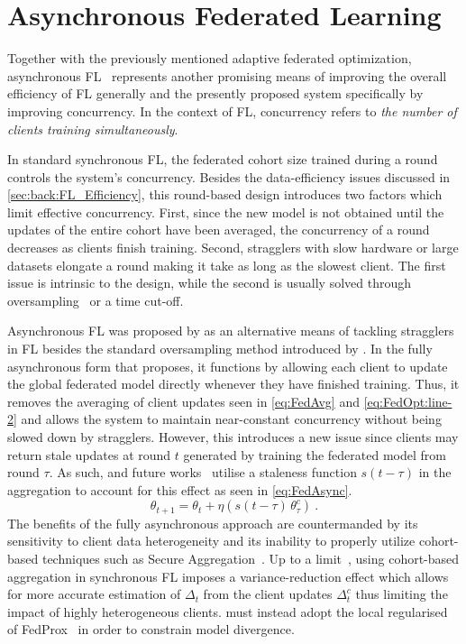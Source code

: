 \section{Asynchronous Federated Learning}
Together with the previously mentioned adaptive federated optimization, asynchronous FL~\citep{AsyncFedOpt,FedBuff,PAPAYA,AsynchronousFLonHetDevicesSurvey,AsyncrhonousOnlineFL} represents another promising means of improving the overall efficiency of FL generally and the presently proposed system specifically by improving concurrency. In the context of FL, concurrency refers to \emph{the number of clients training simultaneously}.

In standard synchronous FL, the federated cohort size trained during a round controls the system's concurrency. Besides the data-efficiency issues discussed in \cref{sec:back:FL_Efficiency}, this round-based design introduces two factors which limit effective concurrency. First, since the new model is not obtained until the updates of the entire cohort have been averaged, the concurrency of a round decreases as clients finish training. Second, stragglers with slow hardware or large datasets elongate a round making it take as long as the slowest client. The first issue is intrinsic to the design, while the second is usually solved through oversampling~\citep{ScaleSystemDesign} or a time cut-off.

Asynchronous FL was proposed by \citet{AsyncFedOpt} as an alternative means of tackling stragglers in FL besides the standard oversampling method introduced by \citet{ScaleSystemDesign}. In the fully asynchronous form that \citet{AsyncFedOpt} proposes, it functions by allowing each client to update the global federated model directly whenever they have finished training. Thus, it removes the averaging of client updates seen in \cref{eq:FedAvg} and \cref{eq:FedOpt:line-2} and allows the system to maintain near-constant concurrency without being slowed down by stragglers. However, this introduces a new issue since clients may return stale updates at round $t$ generated by training the federated model from round $\tau$. As such, \citet{AsyncFedOpt} and future works~\citep{FedBuff,PAPAYA} utilise a staleness function $s(t-\tau)$ in the aggregation to account for this effect as seen in \cref{eq:FedAsync}.
\begin{equation} \label{eq:FedAsync}
    \theta_{t+1} = \theta_t + \eta  \left( s(t-\tau)\, \theta_{\tau}^c \right) \ .
\end{equation}
The benefits of the fully asynchronous approach are countermanded by its sensitivity to client data heterogeneity and its inability to properly utilize cohort-based techniques such as Secure Aggregation~\citep{SecAggOG}. Up to a limit~\citep{LargeCohorts,FedBuff,PAPAYA}, using cohort-based aggregation in synchronous FL imposes a variance-reduction effect which allows for more accurate estimation of $\Delta_t$ from the client updates $\Delta_t^c$ thus limiting the impact of highly heterogeneous clients. \citet{AsyncFedOpt} must instead adopt the local regularised of FedProx~\citep{FedProx} in order to constrain model divergence.

